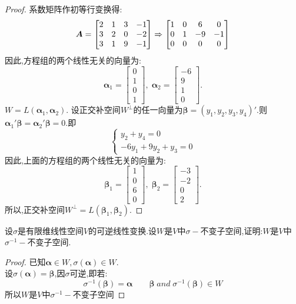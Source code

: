 \documentclass[lang=cn,11pt,normal]{elegantbook}
\begin{document}
	\begin{proof}
		系数矩阵作初等行变换得:
		$$
		\boldsymbol{A}=
		\begin{bmatrix}
		2&1&3&-1\\
		3&2&0&-2\\
		3&1&9&-1
		\end{bmatrix}
		\xRightarrow{}
		\begin{bmatrix}
		1&0&6&0\\
		0&1&-9&-1\\
		0&0&0&0
		\end{bmatrix}
		$$
		因此,方程组的两个线性无关的向量为:
		$$
		\boldsymbol{\alpha}_1=
		\begin{bmatrix}
		0\\1\\0\\1
		\end{bmatrix},\;
		\boldsymbol{\alpha}_2=
		\begin{bmatrix}
		-6\\9\\1\\0
		\end{bmatrix}.
		$$
		$W=L(\boldsymbol{\alpha}_1,\boldsymbol{\alpha}_2)$.
		设正交补空间$W^\perp$的任一向量为$\boldsymbol{\beta}=(y_1,y_2,y_3,y_4)'$.则$\boldsymbol{\alpha}_1'\boldsymbol{\beta}=\boldsymbol{\alpha}_2'\boldsymbol{\beta}=0$.即
		$$
		\begin{cases}
		y_2+y_4=0\\
		-6y_1+9y_2+y_3=0
		\end{cases}
		$$
		因此,上面的方程组的两个线性无关的向量为:
		$$
		\boldsymbol{\beta}_1=
		\begin{bmatrix}
		1\\0\\6\\0
		\end{bmatrix},\;
		\boldsymbol{\beta}_2=
		\begin{bmatrix}
		-3\\-2\\0\\2
		\end{bmatrix}.
		$$
		所以,正交补空间$W^\perp=L(\boldsymbol{\beta}_1,\boldsymbol{\beta}_2)$.
	\end{proof}
	\begin{exercise}
		设$\sigma$是有限维线性空间$V$的可逆线性变换.设$W$是$V$中$\sigma-$不变子空间,证明:$W$是$V$中$\sigma^{-1}-$不变子空间.
	\end{exercise}
	\begin{proof}
		已知$\boldsymbol{\alpha}\in W,\sigma(\boldsymbol{\alpha})\in W$.\\
		设$\sigma(\boldsymbol{\alpha})=\boldsymbol{\beta}$,因$\sigma$可逆,即若:
		$$
		\sigma^{-1}(\boldsymbol{\beta})=\boldsymbol{\alpha}\qquad\boldsymbol{\beta}\;and\;\sigma^{-1}(\boldsymbol{\beta})\in W
		$$
		所以$W$是$V$中$\sigma^{-1}-$不变子空间
	\end{proof}
\end{document}
